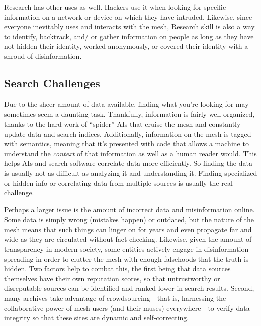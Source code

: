 Research has other uses as well. Hackers use it 
when looking for specific information on a network or 
device on which they have intruded. Likewise, since 
everyone inevitably uses and interacts with the mesh, 
Research skill is also a way to identify, backtrack, and/
or gather information on people as long as they have 
not hidden their identity, worked anonymously, or 
covered their identity with a shroud of disinformation.

\subsection{Search Challenges}

Due to the sheer amount of data available, finding
what you're looking for may sometimes seem a
daunting task. Thankfully, information is fairly well 
organized, thanks to the hard work of ``spider'' AIs 
that cruise the mesh and constantly update data and 
search indices. Additionally, information on the mesh 
is tagged with semantics, meaning that it's presented 
with code that allows a machine to understand the 
\textit{context }of that information as well as a human reader 
would. This helps AIs and search software correlate 
data more efficiently. So finding the data is usually not 
as difficult as analyzing it and understanding it. Finding
specialized or hidden info or correlating data from
multiple sources is usually the real challenge.

Perhaps a larger issue is the amount of incorrect 
data and misinformation online. Some data is simply 
wrong (mistakes happen) or outdated, but the nature 
of the mesh means that such things can linger on for 
years and even propagate far and wide as they are 
circulated without fact-checking. Likewise, given 
the amount of transparency in modern society, some 
entities actively engage in disinformation spreading 
in order to clutter the mesh with enough falsehoods 
that the truth is hidden. Two factors help to combat 
this, the first being that data sources themselves have 
their own reputation scores, so that untrustworthy 
or disreputable sources can be identified and ranked 
lower in search results. Second, many archives take 
advantage of crowdsourcing—that is, harnessing the 
collaborative power of mesh users (and their muses) 
everywhere—to verify data integrity so that these sites 
are dynamic and self-correcting.

